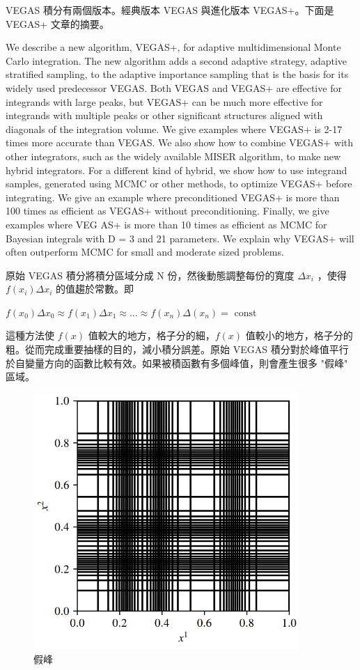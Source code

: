 \documentclass[10pt,UTF8]{ctexart}
\begin{document}
VEGAS 積分有兩個版本。經典版本 VEGAS 與進化版本 VEGAS+。下面是 VEGAS+ 文章的摘要。

We describe a new algorithm, VEGAS+, for adaptive multidimensional Monte Carlo integration. The new algorithm adds a second adaptive strategy, adaptive stratified sampling, to the adaptive importance sampling that is the basis for its widely used predecessor VEGAS. Both VEGAS and VEGAS+ are effective for integrands with large peaks, but VEGAS+ can be much more effective for integrands with multiple peaks or other significant structures aligned with diagonals of the integration volume. We give examples where VEGAS+ is 2-17 times more accurate than VEGAS. We also show how to combine VEGAS+ with other integrators, such as the widely available MISER algorithm, to make new hybrid integrators. For a different kind of hybrid, we show how to use integrand samples, generated using MCMC or other methods, to optimize VEGAS+ before integrating. We give an example where preconditioned VEGAS+ is more than 100 times as efficient as VEGAS+ without preconditioning. Finally, we give examples where VEG AS+ is more than 10 times as efficient as MCMC for Bayesian integrals with D = 3 and 21 parameters. We explain why VEGAS+ will often outperform MCMC for small and moderate sized problems.

原始 VEGAS 積分將積分區域分成 N 份，然後動態調整每份的寬度 $\Delta x_{i} $ ，使得 $f\left(x_{i}\right) \Delta x_{i} $ 的值趨於常數。即

$f\left(x_{0}\right) \Delta x_{0} \approx f\left(x_{1}\right) \Delta x_{1} \approx \ldots \approx f\left(x_{n}\right) \Delta\left(x_{n}\right)=\text { const }$

這種方法使 $f(x)$ 值較大的地方，格子分的細，$f(x)$ 值較小的地方，格子分的粗。從而完成重要抽樣的目的，減小積分誤差。原始 VEGAS 積分對於峰值平行於自變量方向的函數比較有效。如果被積函數有多個峰值，則會產生很多 "假峰" 區域。

\begin{figure}[H]
\centering 
\includegraphics[width=0.90\textwidth]{w15-lab-9.png} 
\caption{假峰}
\label{Test}
\end{figure}
\end{document}
